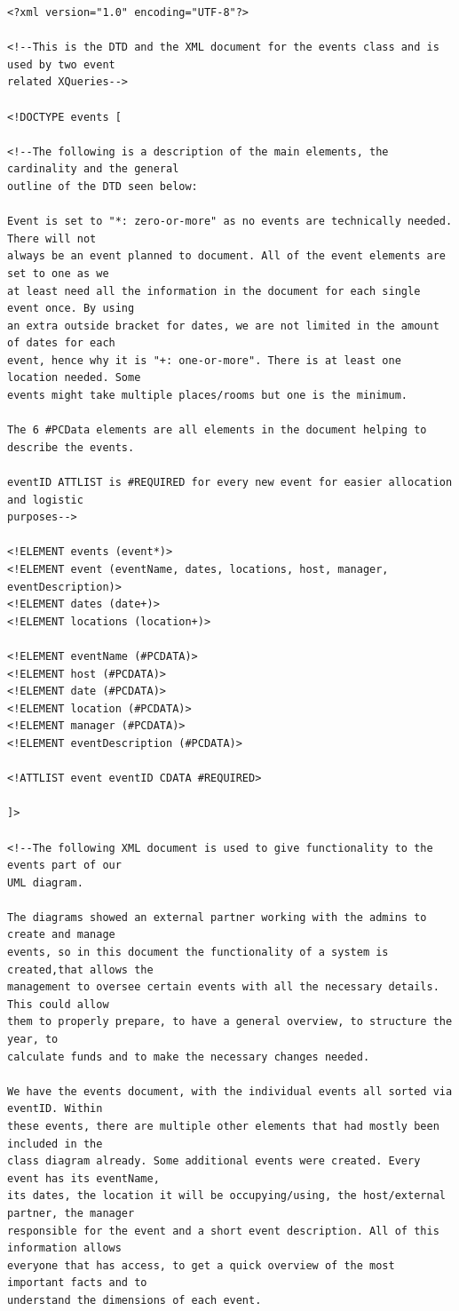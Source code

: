 \documentclass{article} %
\begin{document}
\begin{verbatim}
<?xml version="1.0" encoding="UTF-8"?>

<!--This is the DTD and the XML document for the events class and is used by two event 
related XQueries-->

<!DOCTYPE events [

<!--The following is a description of the main elements, the cardinality and the general 
outline of the DTD seen below:

Event is set to "*: zero-or-more" as no events are technically needed. There will not 
always be an event planned to document. All of the event elements are set to one as we 
at least need all the information in the document for each single event once. By using
an extra outside bracket for dates, we are not limited in the amount of dates for each 
event, hence why it is "+: one-or-more". There is at least one location needed. Some 
events might take multiple places/rooms but one is the minimum.

The 6 #PCData elements are all elements in the document helping to describe the events.

eventID ATTLIST is #REQUIRED for every new event for easier allocation and logistic 
purposes-->

<!ELEMENT events (event*)>		
<!ELEMENT event (eventName, dates, locations, host, manager, eventDescription)>		
<!ELEMENT dates (date+)>		
<!ELEMENT locations (location+)>	

<!ELEMENT eventName (#PCDATA)>		
<!ELEMENT host (#PCDATA)>
<!ELEMENT date (#PCDATA)>
<!ELEMENT location (#PCDATA)>
<!ELEMENT manager (#PCDATA)>
<!ELEMENT eventDescription (#PCDATA)>

<!ATTLIST event eventID CDATA #REQUIRED>  	

]>

<!--The following XML document is used to give functionality to the events part of our 
UML diagram.

The diagrams showed an external partner working with the admins to create and manage 
events, so in this document the functionality of a system is created,that allows the 
management to oversee certain events with all the necessary details. This could allow 
them to properly prepare, to have a general overview, to structure the year, to 
calculate funds and to make the necessary changes needed.
    
We have the events document, with the individual events all sorted via eventID. Within 
these events, there are multiple other elements that had mostly been included in the 
class diagram already. Some additional events were created. Every event has its eventName, 
its dates, the location it will be occupying/using, the host/external partner, the manager 
responsible for the event and a short event description. All of this information allows 
everyone that has access, to get a quick overview of the most important facts and to 
understand the dimensions of each event.


\end{verbatim}
\end{document}
